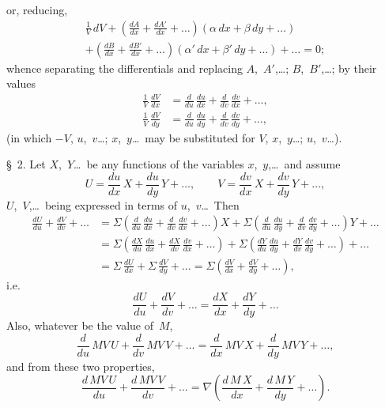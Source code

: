 \documentclass[11pt,a4paper]{article}
\newcommand{\papersection}[1]{\S\ #1.}
\begin{document}
\newpage
or, reducing,
\begin{multline*}
\frac{1}{V}\,dV + \left(\frac{dA}{dx} + \frac{dA'}{dx} + \ldots\right)(\alpha\,dx + \beta\,dy + \ldots) \\
+ \left(\frac{dB}{dx} + \frac{dB'}{dx} + \ldots\right)(\alpha'\,dx + \beta'\,dy + \ldots) + \ldots = 0;
\end{multline*}
whence separating the differentials and replacing $A$,~$A'$,\ldots; $B$,~$B'$,\ldots; by their values
\begin{align*}
\frac{1}{V}\,\frac{dV}{dx} &= \frac{d}{du}\,\frac{du}{dx} + \frac{d}{dv}\,\frac{dv}{dx} + \ldots,\\
\frac{1}{V}\,\frac{dV}{dy} &= \frac{d}{du}\,\frac{du}{dy} + \frac{d}{dv}\,\frac{dv}{dy} + \ldots,
\end{align*}
(in which $-V$, $u$,~$v$\ldots; $x$,~$y$\ldots\ may be substituted for $V$, $x$,~$y$\ldots; $u$,~$v$\ldots).

\vspace{10pt}

\papersection{2} Let $X$,~$Y$\ldots\ be any functions of the variables $x$,~$y$,\ldots\ and assume
\[
U = \frac{du}{dx}\,X + \frac{du}{dy}\,Y + \ldots, \qquad
V = \frac{dv}{dx}\,X + \frac{dv}{dy}\,Y + \ldots,
\]
$U$,~$V$,\ldots\ being expressed in terms of $u$,~$v$\ldots\ Then
\begin{align*}
\frac{dU}{du} + \frac{dV}{dv} + \ldots &= \Sigma\left(\frac{d}{du}\,\frac{du}{dx} + \frac{d}{dv}\,\frac{dv}{dx} + \ldots\right)X + \Sigma\left(\frac{d}{du}\,\frac{du}{dy} + \frac{d}{dv}\,\frac{dv}{dy} + \ldots\right)Y + \ldots \\
&= \Sigma\left(\frac{dX}{du}\,\frac{du}{dx} + \frac{dX}{dv}\,\frac{dv}{dx} + \ldots\right) + \Sigma\left(\frac{dY}{du}\,\frac{du}{dy} + \frac{dY}{dv}\,\frac{dv}{dy} + \ldots\right) + \ldots \\
&= \Sigma\,\frac{dU}{dx} + \Sigma\,\frac{dV}{dy} + \ldots = \Sigma\left(\frac{dV}{dx} + \frac{dV}{dy} + \ldots\right),
\end{align*}
i.e.
\[
\frac{dU}{du} + \frac{dV}{dv} + \ldots = \frac{dX}{dx} + \frac{dY}{dy} + \ldots
\]
Also, whatever be the value of~$M$,
\[
\frac{d}{du}\,MV\,U + \frac{d}{dv}\,MV\,V + \ldots = \frac{d}{dx}\,MV\,X + \frac{d}{dy}\,MV\,Y + \ldots,
\]
and from these two properties,
\[
\frac{d\,MV\,U}{du} + \frac{d\,MV\,V}{dv} + \ldots = \nabla\left(\frac{d\,M\,X}{dx} + \frac{d\,M\,Y}{dy} + \ldots\right).
\]

\vspace{10pt}
\end{document}
